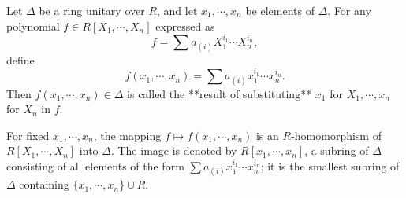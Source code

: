 Let $\Delta$ be a ring unitary over $R$, and let $x_1, \cdots, x_n$ be elements of $\Delta$. For any polynomial $f \in R[X_1, \cdots, X_n]$ expressed as
$$f = \sum a_{(i)} X_1^{i_1} \cdots X_n^{i_n},$$
define
$$f(x_1, \cdots, x_n) = \sum a_{(i)} x_1^{i_1} \cdots x_n^{i_n}.$$
Then $f(x_1, \cdots, x_n) \in \Delta$ is called the **result of substituting** $x_1$ for $X_1, \cdots, x_n$ for $X_n$ in $f$.

For fixed $x_1, \cdots, x_n$, the mapping $f \mapsto f(x_1, \cdots, x_n)$ is an $R$-homomorphism of $R[X_1, \cdots, X_n]$ into $\Delta$. The image is denoted by $R[x_1, \cdots, x_n]$, a subring of $\Delta$ consisting of all elements of the form $\sum a_{(i)} x_1^{i_1} \cdots x_n^{i_n}$; it is the smallest subring of $\Delta$ containing $\{x_1, \cdots, x_n\} \cup R$.
